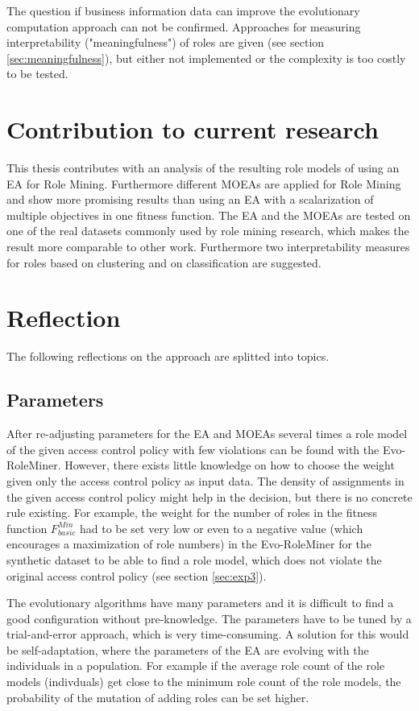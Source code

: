 The question if business information data can improve the evolutionary computation approach can not be confirmed. Approaches for measuring interpretability ("meaningfulness") of roles are given (see section \ref{sec:meaningfulness}), but either not implemented or the complexity is too costly to be tested.

\section{Contribution to current research}
This thesis contributes with an analysis of the resulting role models of using an EA for Role Mining. Furthermore different MOEAs are applied for Role Mining and show more promising results than using an EA with a scalarization of multiple objectives in one fitness function. The EA and the MOEAs are tested on one of the real datasets commonly used by role mining research, which makes the result more comparable to other work. Furthermore two interpretability measures for roles based on clustering and on classification are suggested.

\section{Reflection}
The following reflections on the approach are splitted into topics.
\subsection*{Parameters}
	After re-adjusting parameters for the EA and MOEAs several times a role model of the given access control policy with few violations can be found with the Evo-RoleMiner. However, there exists little knowledge on how to choose the weight given only the access control policy as input data. The density of assignments in the given access control policy might help in the decision, but there is no concrete rule existing. For example, the weight for the number of roles in the fitness function $F_{basic}^{Min}$ had to be set very low or even to a negative value (which encourages a maximization of role numbers) in the Evo-RoleMiner for the synthetic dataset to be able to find a role model, which does not violate the original access control policy (see section \ref{sec:exp3}).
	
	The evolutionary algorithms have many parameters and it is difficult to find a good configuration without pre-knowledge. The parameters have to be tuned by a trial-and-error approach, which is very time-consuming. A solution for this would be self-adaptation, where the parameters of the EA are evolving with the individuals in a population\cite{Eiben}. For example if the average role count of the role models (indivduals) get close to the minimum role count of the role models, the probability of the mutation of adding roles can be set higher. 
	
